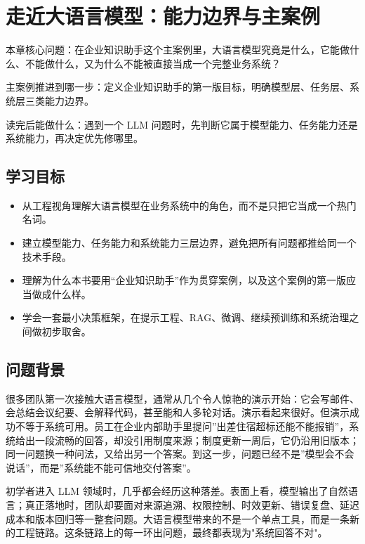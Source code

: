 \chapter{走近大语言模型：能力边界与主案例}

\begin{introduction}
\item {\heiti 本章核心问题}：在企业知识助手这个主案例里，大语言模型究竟是什么，它能做什么、不能做什么，又为什么不能被直接当成一个完整业务系统？
\item {\heiti 主案例推进到哪一步}：定义企业知识助手的第一版目标，明确模型层、任务层、系统层三类能力边界。
\item {\heiti 读完后能做什么}：遇到一个 LLM 问题时，先判断它属于模型能力、任务能力还是系统能力，再决定优先修哪里。
\end{introduction}

\section{学习目标}
\begin{itemize}
  \item 从工程视角理解大语言模型在业务系统中的角色，而不是只把它当成一个热门名词。
  \item 建立模型能力、任务能力和系统能力三层边界，避免把所有问题都推给同一个技术手段。
  \item 理解为什么本书要用“企业知识助手”作为贯穿案例，以及这个案例的第一版应当做成什么样。
  \item 学会一套最小决策框架，在提示工程、RAG、微调、继续预训练和系统治理之间做初步取舍。
\end{itemize}

\section{问题背景}
很多团队第一次接触大语言模型，通常从几个令人惊艳的演示开始：它会写邮件、会总结会议纪要、会解释代码，甚至能和人多轮对话。演示看起来很好。但演示成功不等于系统可用。员工在企业内部助手里提问”出差住宿超标还能不能报销”，系统给出一段流畅的回答，却没引用制度来源；制度更新一周后，它仍沿用旧版本；同一问题换一种问法，又给出另一个答案。到这一步，问题已经不是”模型会不会说话”，而是”系统能不能可信地交付答案”。

初学者进入 LLM 领域时，几乎都会经历这种落差。表面上看，模型输出了自然语言；真正落地时，团队却要面对来源追溯、权限控制、时效更新、错误复盘、延迟成本和版本回归等一整套问题。大语言模型带来的不是一个单点工具，而是一条新的工程链路。这条链路上的每一环出问题，最终都表现为"系统回答不对"。

